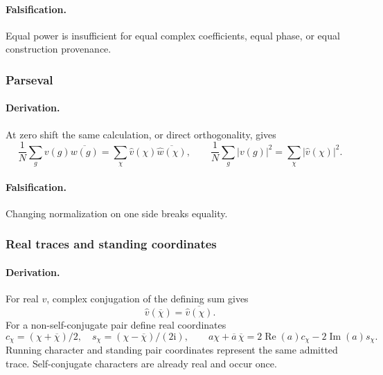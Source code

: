 \paragraph{Falsification.} Equal power is insufficient for equal complex
coefficients, equal phase, or equal construction provenance.


\subsubsection{Parseval}
\paragraph{Derivation.}
At zero shift the same calculation, or direct orthogonality, gives
\begin{equation}
\frac1N\sum_g v(g)\overline{w(g)}
=\sum_\chi\widehat v(\chi)\overline{\widehat w(\chi)},
\qquad \frac1N\sum_g|v(g)|^2=\sum_\chi|\widehat v(\chi)|^2.
\label{eq:fourier-parseval}
\end{equation}
\paragraph{Falsification.} Changing normalization on one side breaks equality.


\subsubsection{Real traces and standing coordinates}
\paragraph{Derivation.}
For real \(v\), complex conjugation of the defining sum gives
\begin{equation}
\widehat v(\overline\chi)=\overline{\widehat v(\chi)}.
\label{eq:fourier-real-symmetry}
\end{equation}
For a non-self-conjugate pair define real coordinates
\begin{equation}
c_\chi=(\chi+\overline\chi)/2,\quad
s_\chi=(\chi-\overline\chi)/(2\mathrm i),\qquad
a\chi+\overline a\,\overline\chi
=2\operatorname{Re}(a)c_\chi-2\operatorname{Im}(a)s_\chi.
\label{eq:fourier-running-standing}
\end{equation}
Running character and standing pair coordinates represent the same admitted
trace. Self-conjugate characters are already real and occur once.
